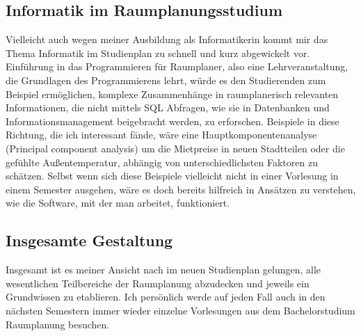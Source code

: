 \documentclass[]{article}
\begin{document}
\subsection{Informatik im Raumplanungsstudium}
Vielleicht auch wegen meiner Ausbildung als Informatikerin kommt mir das Thema Informatik im Studienplan zu schnell und kurz abgewickelt vor. Einführung in das Programmieren für Raumplaner, also eine Lehrveranstaltung, die Grundlagen des Programmierens lehrt, würde es den Studierenden zum Beispiel ermöglichen, komplexe Zusammenhänge in raumplanerisch relevanten Informationen, die nicht mittels SQL Abfragen, wie sie in Datenbanken und Informationsmanagement beigebracht werden, zu erforschen. Beispiele in diese Richtung, die ich interessant fände, wäre eine Hauptkomponentenanalyse (Principal component analysis) um die Mietpreise in neuen Stadtteilen oder die gefühlte Außentemperatur, abhängig von unterschiedlichsten Faktoren zu schätzen. Selbst wenn sich diese Beispiele vielleicht nicht in einer Vorlesung in einem Semester ausgehen, wäre es doch bereits hilfreich in Ansätzen zu verstehen, wie die Software, mit der man arbeitet, funktioniert.

\subsection{Insgesamte Gestaltung}
Insgesamt ist es meiner Ansicht nach im neuen Studienplan gelungen, alle wesentlichen Teilbereiche der Raumplanung abzudecken und jeweils ein Grundwissen zu etablieren. Ich persönlich werde auf jeden Fall auch in den nächsten Semestern immer wieder einzelne Vorlesungen aus dem Bachelorstudium Raumplanung besuchen.

 

\end{document}

